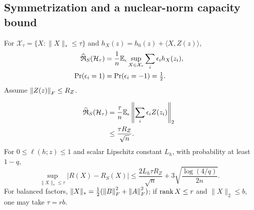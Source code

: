 \subsection{Symmetrization and a nuclear-norm capacity bound}
\begin{definition}
For $\mathcal X_\tau=\{X:\|X\|_*\leq\tau\}$ and
$h_X(z)=h_0(z)+\langle X,Z(z)\rangle$,
\begin{align}
\widehat{\mathfrak R}_S(\mathcal H_\tau)
&=\frac1n\mathbb E_\epsilon\sup_{X\in\mathcal X_\tau}
\sum_i\epsilon_i h_X(z_i),\\
\Pr(\epsilon_i=1)&=\Pr(\epsilon_i=-1)=\tfrac12 .
\end{align}
Assume $\left\lVert Z(z)\right\rVert_F\leq R_Z$.
\end{definition}

\begin{theorem}
\label{thm:nuclear-generalization}
\begin{align}
\widehat{\mathfrak R}_S(\mathcal H_\tau)
&=\frac{\tau}{n}\mathbb E_\epsilon
\left\|\sum_i\epsilon_i Z(z_i)\right\|_2\\
&\leq\frac{\tau R_Z}{\sqrt n}.
\label{eq:rigid-nuclear-complexity}
\end{align}
For $0\leq\ell(h;z)\leq1$ and scalar Lipschitz constant $L_h$,
with probability at least $1-q$,
\begin{equation}
\sup_{\|X\|_*\leq\tau}|R(X)-R_S(X)|
\leq\frac{2L_h\tau R_Z}{\sqrt n}
+3\sqrt{\frac{\log(4/q)}{2n}} .
\label{eq:rigid-nuclear-generalization}
\end{equation}
For balanced factors,
$\|X\|_*=\frac12(\left\lVert B\right\rVert_F^2+\left\lVert A\right\rVert_F^2)$; if $\operatorname{rank} X\leq r$ and
$\|X\|_2\leq b$, one may take $\tau=rb$.
\end{theorem}
